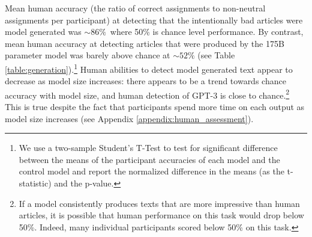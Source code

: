 \documentclass{article}
\begin{document}
Mean human accuracy (the ratio of correct assignments to non-neutral assignments per participant) at detecting that the intentionally bad articles were model generated was  $\sim86\%$\, where 50\% is chance level performance. By contrast, mean human accuracy at detecting articles that were produced by the 175B parameter model was barely above chance at $\sim52\%$ (see Table \ref{table:generation}).\footnote{We use a two-sample Student’s T-Test to test for significant difference between the means of the participant accuracies of each model and the control model and report the normalized difference in the means (as the t-statistic) and the p-value.} Human abilities to detect model generated text appear to decrease as model size increases: there appears to be a trend towards chance accuracy with model size, and human detection of GPT-3 is close to chance.\footnote{If a model consistently produces texts that are more impressive than human articles, it is possible that human performance on this task would drop below 50\%. Indeed, many individual participants scored below 50\% on this task.} This is true despite the fact that participants spend more time on each output as model size increases (see Appendix \ref{appendix:human_assessment}).
\end{document}

